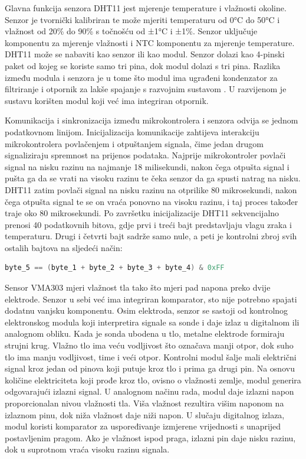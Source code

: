Glavna funkcija senzora DHT11 jest mjerenje temperature i vlažnosti okoline. Senzor je tvornički kalibriran te može mjeriti temperaturu od 0°C do 50°C i vlažnost od 20\% do 90\% s točnošću od ±1°C i ±1\%. Senzor uključuje komponentu za mjerenje vlažnosti i NTC  komponentu za mjerenje temperature. DHT11 može se nabaviti kao senzor ili kao modul. Senzor dolazi kao 4-pinski paket od kojeg se koriste samo tri pina, dok modul dolazi s tri pina. Razlika između modula i senzora je u tome što modul ima ugrađeni kondenzator za filtriranje i otpornik za lakše spajanje s razvojnim sustavom \cite{dht11}. U razvijenom je sustavu korišten modul koji već ima integriran otpornik. 

Komunikacija i sinkronizacija između mikrokontrolera i senzora odvija se jednom podatkovnom linijom. Inicijalizacija komunikacije zahtijeva interakciju mikrokontrolera povlačenjem i otpuštanjem signala, čime jedan drugom signaliziraju spremnost na prijenos podataka. Najprije mikrokontroler povlači signal na nisku razinu na najmanje 18 milisekundi, nakon čega otpušta signal i pušta ga da se vrati na visoku razinu te čeka senzor da ga spusti natrag na nisku. DHT11 zatim povlači signal na nisku razinu na otprilike 80 mikrosekundi, nakon čega otpušta signal te se on vraća ponovno na visoku razinu, i taj proces također traje oko 80 mikrosekundi. Po završetku inicijalizacije DHT11 sekvencijalno prenosi 40 podatkovnih bitova, gdje prvi i treći bajt predstavljaju vlagu zraka i temperaturu. Drugi i četvrti bajt sadrže samo nule, a peti je kontrolni zbroj  svih ostalih bajtova na sljedeći način:

\begin{lstlisting}[caption={Kontrolni zbroj poslanih bajtova s DHT11}, language=c]
	byte_5 == (byte_1 + byte_2 + byte_3 + byte_4) & 0xFF
\end{lstlisting}

Sensor VMA303 mjeri vlažnost tla tako što mjeri pad napona preko dvije elektrode. Senzor u sebi već ima integriran komparator, sto nije potrebno spajati dodatnu vanjsku komponentu. Osim elektroda, senzor se sastoji od kontrolnog elektronskog modula koji interpretira signale sa sonde i daje izlaz u digitalnom ili analognom obliku. Kada je sonda ubodena u tlo, metalne elektrode formiraju strujni krug. Vlažno tlo ima veću vodljivost što označava manji otpor, dok suho tlo ima manju vodljivost, time i veći otpor. Kontrolni modul šalje mali električni signal kroz jedan od pinova koji putuje kroz tlo i prima ga drugi pin. Na osnovu količine elektriciteta koji prođe kroz tlo, ovisno o vlažnosti zemlje, modul generira odgovarajući izlazni signal. U analognom načinu rada, modul daje izlazni napon proporcionalan nivou vlažnosti tla. Viša vlažnost rezultira višim naponom na izlaznom pinu, dok niža vlažnost daje niži napon. U slučaju digitalnog izlaza, modul koristi komparator za uspoređivanje izmjerene vrijednosti s unaprijed postavljenim pragom. Ako je vlažnost ispod praga, izlazni pin daje nisku razinu, dok u suprotnom vraća visoku razinu signala.

